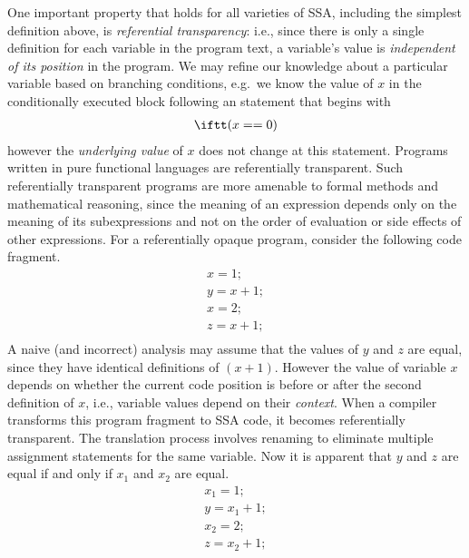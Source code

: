 One important property that holds for all varieties of SSA, including the simplest definition above, is \emph{referential transparency}: 
i.e., since there is only a single definition for each variable in the program text, a variable's value is \textit{independent of its position} in the program. 
We may refine our knowledge about a particular variable based on branching conditions, e.g.\ we know the value of $x$ in the conditionally executed block following an \iftt statement that begins with \begin{equation*} \begin{array}{l} \iftt (x==0) \end{array} \end{equation*} however the \textit{underlying value} of $x$ does not change at this \iftt statement. 
Programs written in pure functional languages are referentially transparent.
%
Such referentially transparent programs are more amenable to formal methods and mathematical reasoning, since the meaning of an expression depends only on the meaning of its subexpressions and not on the order of evaluation or side effects of other expressions.
%
For a referentially opaque program, consider the following code fragment.
\begin{equation*} \begin{array}{l} x = 1;\\ y = x + 1;\\ x = 2;\\ z = x + 1;\\ \end{array} \end{equation*}
A naive (and incorrect) analysis may assume that the values of $y$ and $z$ are equal, since they have identical definitions of $(x+1)$. 
However the value of variable $x$ depends on whether the current code position is before or after the second definition of $x$, i.e., variable values depend on their \textit{context}.
%
When a compiler transforms this program fragment to SSA code, it becomes referentially transparent. 
The translation process involves renaming to eliminate multiple assignment statements for the same variable. 
Now it is apparent that $y$ and $z$ are equal if and only if $x_1$ and $x_2$ are equal.
\begin{equation*} \begin{array}{l} x_1 = 1;\\ y  = x_1 + 1;\\ x_2 = 2;\\ z  = x_2 + 1;
\end{array} \end{equation*}


